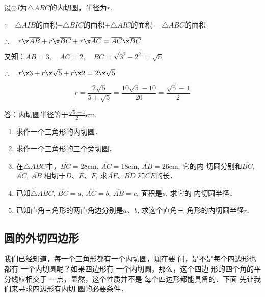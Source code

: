   \begin{solution}
    设$\odot I$为$\triangle ABC$的内切圆，半径为$r$.
  
  $\because\quad \triangle AIB$的面积$+\triangle BIC$的面积$+\triangle AIC$的面积$=\triangle ABC$的面积
  
  $\therefore\quad r\x \overline{AB}+r\x \overline{BC}+r\x \overline{AC}=\overline{AC}\x \overline{BC}$
  
  又知：$\overline{AB}=3,\quad \overline{AC}=2,\quad \overline{BC}=\sqrt{3^2-2^2}=\sqrt{5}$
  
  $\therefore\quad r\x 3+r\x \sqrt{5}+r\x 2=2\x \sqrt{5}$
  
  \[r=\frac{2\sqrt{5}}{5+\sqrt{5}}=\frac{10\sqrt{5}-10}{20}=\frac{\sqrt{5}-1}{2}\]
  
  答：内切圆半径等于$\frac{\sqrt{5}-1}{2}$cm.
  \end{solution}

\begin{ex}
\begin{enumerate}
    \item 求作一个三角形的内切圆．
    \item 求作一个三角形的三个旁切圆．
    \item 在$\triangle ABC$中，$\overline{BC}=28$cm, $\overline{AC}=18$cm, $\overline{AB}=26$cm, 它的内
    切圆分别和$\overline{BC}$, $\overline{AC}$, $\overline{AB}$
    相切于$D$、$E$、$F$, 求$\overline{AF}$、$\overline{BD}$
    和$\overline{CE}$的长．
    \item 已知$\triangle ABC$, $\overline{BC}=a$, $\overline{AC}=b$, $\overline{AB}=c$, 面积是$s$, 求它的
    内切圆半径．
    \item 已知直角三角形的两直角边分别是$a$、$b$, 求这个直角三
    角形的内切圆半径$r$.
\end{enumerate}
\end{ex}

\subsection{圆的外切四边形}

我们已经知道，每一个三角形都有一个内切圆，现在要
问，是不是每个四边形也都有
一个内切圆呢？如果四边形有
一个内切圆，那么，这个四边
形的四个角的平分线应相交于
一点，显然，这个性质并不是
每个四边形都能具备的．下面
先让我们来寻求四边形有内切
圆的必要条件．

\begin{figure}[htp]
    \centering
{}
    \caption{}
\end{figure}


